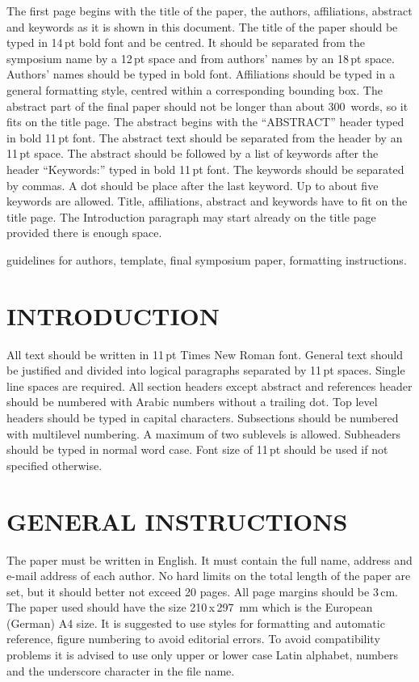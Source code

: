 \documentclass{bmd2016p}
\begin{document}
The first page begins with the title of the paper, the authors, affiliations, 
abstract and keywords as it is shown in this document. The title of the paper 
should be typed in 14\,pt bold font and be centred. It should be separated 
from the symposium name by a 12\,pt space and from authors' names by an 18\,pt 
space. Authors' names should be typed in bold font. Affiliations should be 
typed in a general formatting style, centred within a corresponding bounding 
box. The abstract part of the final paper should not be longer than about 
300~words, so it fits on the title page. The abstract begins with the 
``ABSTRACT'' header typed in bold 11\,pt font. The abstract text should be 
separated from the header by an 11\,pt space. The abstract should be followed 
by a list of keywords after the header ``Keywords:'' typed in bold 11\,pt 
font. The keywords should be separated by commas. A dot should be place after 
the last keyword. Up to about five keywords are allowed. Title, affiliations, 
abstract and keywords have to fit on the title page. The Introduction 
paragraph may start already on the title page provided there is enough space.

\begin{keywords}
guidelines for authors, 
template, 
final symposium paper, 
formatting instructions.
\end{keywords}

\section{INTRODUCTION}

All text should be written in 11\,pt Times New Roman font. General text should 
be justified and divided into logical paragraphs separated by 11\,pt spaces. 
Single line spaces are required. All section headers except abstract and 
references header should be numbered with Arabic numbers without a trailing 
dot. Top level headers should be typed in capital characters. Subsections 
should be numbered with multilevel numbering. A maximum of two sublevels is 
allowed. Subheaders should be typed in normal word case. Font size of 11\,pt 
should be used if not specified otherwise. 

\section{GENERAL INSTRUCTIONS}

The paper must be written in English. It must contain the full name, address 
and e-mail address of each author. No hard limits on the total length of the 
paper are set, but it should better not exceed 20 pages. All page margins 
should be 3\,cm. The paper used should have the size 210\,x\,297\, mm 
which is the European (German) A4 size. It is suggested to use styles for 
formatting and automatic reference, figure numbering to avoid editorial 
errors. To avoid compatibility problems it is advised to use only upper or 
lower case Latin alphabet, numbers and the underscore character in the file 
name.
\end{document}
